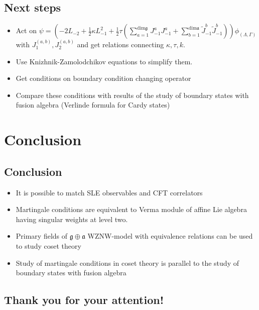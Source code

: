 \documentclass[12pt]{article}
\theoremstyle{definition}
\newcommand{\gf}{\mathfrak{g}}
\newcommand{\af}{\mathfrak{a}}
\theoremstyle{definition} \newtheorem{Def}{Definition}
\begin{document}
\subsection{Next steps}
\begin{itemize}
\item Act on $  \psi=\left(-2L_{-2}+\frac{1}{2}\kappa L_{-1}^{2}+\frac{1}{2}\tau \left(\sum\limits_{a=1}^{\mathrm{dim}\gf}J^{a}_{-1}J^{a}_{-1}+\sum\limits_{b=1}^{\mathrm{dim}\af}\tilde{J}^{b}_{-1}\tilde{J}^{b}_{-1}\right)\right) \phi_{(\Lambda,\Gamma)}$ with $J^{(a,b)}_{1}, J^{(a,b)}_{2}$ and get relations connecting $\kappa, \tau, k$. 
\item Use Knizhnik-Zamolodchikov equations to simplify them.
\item Get conditions on boundary condition changing operator
\item Compare these conditions with results of  the study of boundary states with fusion algebra (Verlinde formula for Cardy states)
\end{itemize}


\section{Conclusion}
\label{sec:conclusion}



\subsection{Conclusion}
\begin{itemize}
\item It is possible to match SLE observables and CFT correlators
\item Martingale conditions are equivalent to Verma module of affine Lie algebra having singular weights at level two.
\item Primary fields of $\gf\oplus \af$ WZNW-model with equivalence relations can be used to study coset theory
\item Study of martingale conditions in coset theory is parallel to the study of boundary states with fusion algebra
\end{itemize}



\subsection{Thank you for your attention!}
\end{document}
